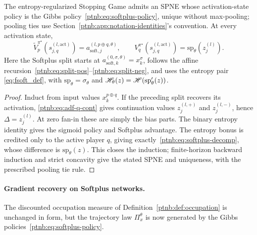 \begin{theoremenv}\label{ptnb:thm:softplus-forward}\label{prop:softplus_game}
The entropy-regularized Stopping Game admits an SPNE whose activation-state policy is the Gibbs policy~\eqref{ptnb:eq:softplus-policy},
unique without max-pooling; pooling ties use Section~\ref{ptnb:app:notation-identities}'s convention.
At every activation state,
\begin{equation}\label{ptnb:eq:softplus-spne-tildes}
    \tilde V_p^{\pi^\star}(s_{j,q}^{(l,\mathrm{act})})
       =a_{\mathrm{soft},j}^{(l,p\oplus q,\theta)},\qquad
    V_q^{\pi^\star}(s_{j,q}^{(l,\mathrm{act})})=\mathrm{sp}_\theta(z_j^{(l)}).
\end{equation}
Here the Softplus split starts at $a_{\mathrm{soft},k}^{(0,\sigma,\theta)}=x_k^\sigma$, follows the affine
recursion~\eqref{ptnb:eq:split-pos}--\eqref{ptnb:eq:split-neg}, and uses the entropy pair
\eqref{eq:fsoft_def}, with $\mathrm{sp}_\theta=\sigma_\theta$ and
$\mathscr{H}_\theta(z)=\mathscr{H}(\mathrm{sp}'_\theta(z))$.
\end{theoremenv}
\begin{proof}
Induct from input values $x_k^{p\oplus q}$. If the preceding split recovers its activation,
\eqref{ptnb:eq:adf-q-cont} gives continuation values $z_j^{(l,+)}$ and $z_j^{(l,-)}$, hence
$\Delta=z_j^{(l)}$. At zero fan-in these are simply the bias parts. The binary entropy identity
gives the sigmoid policy and Softplus advantage. The entropy bonus is credited only to the active player $q$, giving exactly~\eqref{ptnb:eq:softplus-decomp}, whose difference is $\mathrm{sp}_\theta(z)$.
This closes the induction; finite-horizon backward induction and strict concavity give the stated
SPNE and uniqueness, with the prescribed pooling tie rule.
\end{proof}

\paragraph{Gradient recovery on Softplus networks.}\label{ptnb:app:softplus-gradient}
The discounted occupation measure of Definition~\ref{ptnb:def:occupation} is unchanged in form, but the
trajectory law $\Pi_x^\theta$ is now generated by the Gibbs policies~\eqref{ptnb:eq:softplus-policy}.

